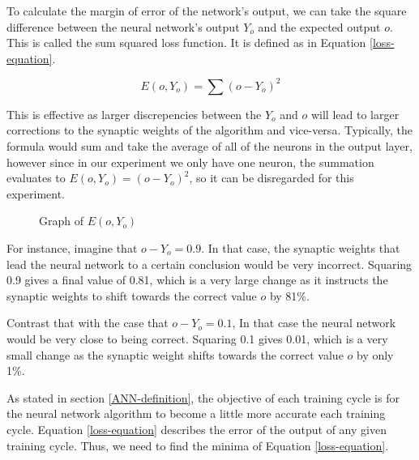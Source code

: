 \documentclass[12pt]{article}
\begin{document}
To calculate the margin of error of the network's output, we can take the square difference between the neural network's output \(Y_o\) and the expected output \(o\). This is called the sum squared loss function. It is defined as in Equation \ref{loss-equation}.

\begin{equation} \label{loss-equation}
    E(o , Y_o) = \sum (o - Y_o)^2
\end{equation}

This is effective as larger discrepencies between the $Y_o$ and $o$ will lead to larger corrections to the synaptic weights of the algorithm and vice-versa. Typically, the formula would sum and take the average of all of the neurons in the output layer, however since in our experiment we only have one neuron, the summation evaluates to $E(o , Y_o) = (o - Y_o)^2$, so it can be disregarded for this experiment.

\begin{figure}[h]
    \centering
    \caption{Graph of $E(o, Y_o)$ \label{errorgraph}}
\end{figure}

For instance, imagine that $o - Y_o = 0.9$. In that case, the synaptic weights that lead the neural network to a certain conclusion would be very incorrect. Squaring 0.9 gives a final value of 0.81, which is a very large change as it instructs the synaptic weights to shift towards the correct value $o$ by 81\%.

Contrast that with the case that $o - Y_o = 0.1$, In that case the neural network would be very close to being correct. Squaring 0.1 gives 0.01, which is a very small change as the synaptic weight shifts towards the correct value $o$ by only 1\%.

As stated in section \ref{ANN-definition}, the objective of each training cycle is for the neural network algorithm to become a little more accurate each training cycle. Equation \ref{loss-equation} describes the error of the output of any given training cycle. Thus, we need to find the minima of Equation \ref{loss-equation}.
\end{document}
